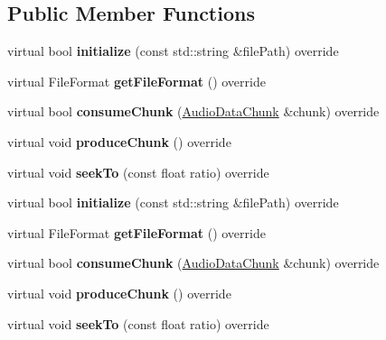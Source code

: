 \subsection*{Public Member Functions}
\begin{DoxyCompactItemize}
\item 
\mbox{\label{classexperimental_1_1OGGReader_ad31b98876a8a65222b0a721be70cfd7f}} 
virtual bool {\bfseries initialize} (const std\+::string \&file\+Path) override
\item 
\mbox{\label{classexperimental_1_1OGGReader_a06b2d6e0fb923043f124d7f4a107843d}} 
virtual File\+Format {\bfseries get\+File\+Format} () override
\item 
\mbox{\label{classexperimental_1_1OGGReader_afe5cee8077c0a6cc383b67e746d073ca}} 
virtual bool {\bfseries consume\+Chunk} (\hyperlink{structexperimental_1_1AudioDataChunk}{Audio\+Data\+Chunk} \&chunk) override
\item 
\mbox{\label{classexperimental_1_1OGGReader_aa68c6e99845bd89eac2e470be1f7313b}} 
virtual void {\bfseries produce\+Chunk} () override
\item 
\mbox{\label{classexperimental_1_1OGGReader_a610404b851d075147d09760213349ee8}} 
virtual void {\bfseries seek\+To} (const float ratio) override
\item 
\mbox{\label{classexperimental_1_1OGGReader_ad31b98876a8a65222b0a721be70cfd7f}} 
virtual bool {\bfseries initialize} (const std\+::string \&file\+Path) override
\item 
\mbox{\label{classexperimental_1_1OGGReader_a06b2d6e0fb923043f124d7f4a107843d}} 
virtual File\+Format {\bfseries get\+File\+Format} () override
\item 
\mbox{\label{classexperimental_1_1OGGReader_afe5cee8077c0a6cc383b67e746d073ca}} 
virtual bool {\bfseries consume\+Chunk} (\hyperlink{structexperimental_1_1AudioDataChunk}{Audio\+Data\+Chunk} \&chunk) override
\item 
\mbox{\label{classexperimental_1_1OGGReader_aa68c6e99845bd89eac2e470be1f7313b}} 
virtual void {\bfseries produce\+Chunk} () override
\item 
\mbox{\label{classexperimental_1_1OGGReader_a610404b851d075147d09760213349ee8}} 
virtual void {\bfseries seek\+To} (const float ratio) override
\end{DoxyCompactItemize}
